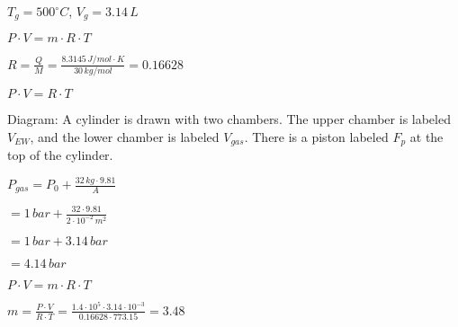\( T_g = 500^\circ C \), \( V_g = 3.14 \, L \)  

\( P \cdot V = m \cdot R \cdot T \)  

\( R = \frac{Q}{M} = \frac{8.3145 \, J/mol \cdot K}{30 \, kg/mol} = 0.16628 \)  

\( P \cdot V = R \cdot T \)  

Diagram: A cylinder is drawn with two chambers. The upper chamber is labeled \( V_{EW} \), and the lower chamber is labeled \( V_{gas} \). There is a piston labeled \( F_p \) at the top of the cylinder.  

\( P_{gas} = P_0 + \frac{32 \, kg \cdot 9.81}{A} \)  

\( = 1 \, bar + \frac{32 \cdot 9.81}{2 \cdot 10^{-2} \, m^2} \)  

\( = 1 \, bar + 3.14 \, bar \)  

\( = 4.14 \, bar \)  

\( P \cdot V = m \cdot R \cdot T \)  

\( m = \frac{P \cdot V}{R \cdot T} = \frac{1.4 \cdot 10^5 \cdot 3.14 \cdot 10^{-3}}{0.16628 \cdot 773.15} = 3.48 \)
